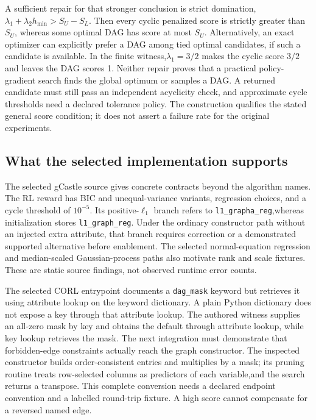 A sufficient repair for that stronger conclusion is strict domination,
$\lambda_1+\lambda_2h_{\min}>S_U-S_L$. Then every cyclic penalized score is strictly greater
than $S_U$, whereas some optimal DAG has score at most $S_U$. Alternatively, an exact optimizer
can explicitly prefer a DAG among tied optimal candidates, if such a candidate is available.
In the finite witness,$\lambda_1=3/2$ makes the cyclic score $3/2$ and leaves the DAG scores 1.
Neither repair proves that a practical policy-gradient search finds the global optimum or samples
a DAG. A returned candidate must still pass an independent acyclicity check, and approximate
cycle thresholds need a declared tolerance policy. The construction qualifies the stated general
score condition; it does not assert a failure rate for the original experiments.
\citep{exec28_rl_reference}

\subsection{What the selected implementation supports}
The selected gCastle source gives concrete contracts beyond the algorithm names. The RL reward
has BIC and unequal-variance variants, regression choices, and a cycle threshold of $10^{-5}$.
Its positive-$\ell_1$ branch refers to \texttt{l1\_grapha\_reg},whereas initialization stores
\texttt{l1\_graph\_reg}. Under the ordinary constructor path without an injected extra attribute,
that branch requires correction or a demonstrated supported alternative before enablement.
The selected normal-equation regression and median-scaled Gaussian-process paths also motivate
rank and scale fixtures. These are static source findings, not observed runtime error counts.
\citep{exec28_rl_gcastle}

The selected CORL entrypoint documents a \texttt{dag\_mask} keyword but retrieves it using
attribute lookup on the keyword dictionary. A plain Python dictionary does not expose a key
through that attribute lookup. The authored witness supplies an all-zero mask by key and obtains
the default through attribute lookup, while key lookup retrieves the mask. The next integration
must demonstrate that forbidden-edge constraints actually reach the graph constructor.
The inspected constructor builds order-consistent entries and multiplies by a mask; its pruning
routine treats row-selected columns as predictors of each variable,and the search returns a
transpose. This complete conversion needs a declared endpoint convention and a labelled
round-trip fixture. A high score cannot compensate for a reversed named edge.
\citep{exec28_rl_gcastle,exec28_rl_reference}

